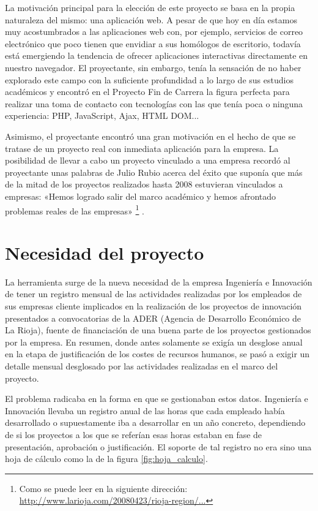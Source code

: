 La motivación principal para la elección de este proyecto se basa en la propia
naturaleza del mismo: una aplicación web. A pesar de que hoy en día estamos muy
acostumbrados a las aplicaciones web con, por ejemplo, servicios de correo
electrónico que poco tienen que envidiar a sus homólogos de escritorio, todavía
está emergiendo la tendencia de ofrecer aplicaciones interactivas directamente
en nuestro navegador. El proyectante, sin embargo, tenía la sensación de no
haber explorado este campo con la suficiente profundidad a lo largo de sus
estudios académicos y encontró en el Proyecto Fin de Carrera la figura perfecta
para realizar una toma de contacto con tecnologías con las que tenía poca o
ninguna experiencia: PHP, JavaScript, Ajax, HTML DOM...

Asimismo, el proyectante encontró una gran motivación en el hecho de que se
tratase de un proyecto real con inmediata aplicación para la empresa. La
posibilidad de llevar a cabo un proyecto vinculado a una empresa recordó al
proyectante unas palabras de Julio Rubio acerca del éxito que suponía que más de
la mitad de los proyectos realizados hasta 2008 estuvieran vinculados a
empresas: «Hemos logrado salir del marco académico y hemos afrontado problemas
reales de las empresas» \footnote{Como se puede leer en la siguiente
dirección:\newline
\href{http://goo.gl/S0dIO}{http://www.larioja.com/20080423/rioja-region/...}} .


\section{Necesidad del proyecto}
\label{sec:necesidad}

La herramienta surge de la nueva necesidad de la empresa Ingeniería e Innovación
de tener un registro mensual de las actividades realizadas por los
empleados de sus empresas cliente implicados en la realización de los proyectos
de innovación presentados a convocatorias de la ADER (Agencia de Desarrollo
Económico de La Rioja), fuente de financiación de una buena parte de los
proyectos gestionados por la empresa. En resumen, donde antes solamente se
exigía un desglose anual en la etapa de justificación de los costes de recursos
humanos, se pasó a exigir un detalle mensual desglosado por las actividades
realizadas en el marco del proyecto.

El problema radicaba en la forma en que se gestionaban estos datos. Ingeniería e
Innovación llevaba un registro anual de las horas que cada empleado había
desarrollado o supuestamente iba a desarrollar en un año concreto, dependiendo
de si los proyectos a los que se referían esas horas estaban en fase de
presentación, aprobación o justificación. El soporte de tal registro no era sino
una hoja de cálculo como la de la figura \ref{fig:hoja_calculo}.

